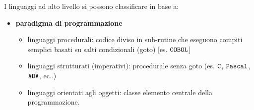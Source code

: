 I linguaggi ad alto livello si possono classificare in base a:
\begin{itemize}[label=$\circ$, itemsep=\medskipamount]
    \item \textbf{paradigma di programmazione}
    \begin{itemize}[itemsep=\smallskipamount]
        \item linguaggi procedurali: codice diviso in sub-rutine che eseguono compiti semplici basati su salti condizionali (goto) [es. $\verb|COBOL|$]
        \item linguaggi strutturati (imperativi): procedurale senza goto (es. $\verb|C|$, $\verb|Pascal|$, $\verb|ADA|$, ec..)
        \item linguaggi orientati agli oggetti: classe elemento centrale della programmazione.
        

\end{itemize}
\end{itemize}
